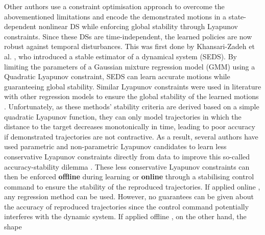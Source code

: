Other authors use a constraint optimisation approach to overcome the abovementioned limitations and encode the demonstrated motions in a state-dependent nonlinear DS while enforcing global stability through Lyapunov constraints. Since these DSs are time-independent, the learned policies are now robust against temporal disturbances. This was first done by Khansari-Zadeh et al. \cite{khansari-zadehLearningStableNonlinear2011}, who introduced a stable estimator of a dynamical system (SEDS). By limiting the parameters of a Gaussian mixture regression model (GMM) using a Quadratic Lyapunov constraint, SEDS can learn accurate motions while guaranteeing global stability. Similar Lyapunov constraints were used in literature with other regression models to ensure the global stability of the learned motions \cite{lemmeNeurallyImprintedStable2013,huNeuralLearningStable2015,umlauftLearningStableStochastic2017,umlauftLearningStableGaussian2017,medinaLearningStableTask2017,duanFastStableLearning2019,xuRobotTrajectoryTracking2019,umlauftLearningStochasticallyStable2020,ledererGaussianProcessBasedRealTime2021,xuLearningBasedKinematicControl2022,salehiLearningDiscreteTimeUncertain2022,davoodiRuleBasedSafeProbabilistic2022}. Unfortunately, as these methods' stability criteria are derived based on a simple quadratic Lyapunov function, they can only model trajectories in which the distance to the target decreases monotonically in time, leading to poor accuracy if demonstrated trajectories are not contractive. As a result, several authors have used parametric and non-parametric Lyapunov candidates to learn less conservative Lyapunov constraints directly from data to improve this so-called accuracy-stability dilemma \cite{mohammadkhansari-zadehLearningControlLyapunov2014,neumannNeuralLearningStable2013,lemmeNeuralLearningVector2014,umlauftLearningStableGaussian2017,umlauftUncertaintybasedControlLyapunov2018,duttaLearningStableMovement2018,umlauftUncertaintybasedHumanMotion2019,duttaSkillLearningHuman2021,ravanbakhshLearningControlLyapunov2019,ravanbakhshFormalPolicyLearning2019,umlauftLearningStochasticallyStable2020,xiaoLearningStableNonparametric2020,tesfazgiInverseReinforcementLearning2021,coulombeGeneratingStableCollisionFree2022,jinLearningNeuralshapedQuadratic2023}. These less conservative Lyapunov constraints can then be enforced \textbf{offline} during learning or \textbf{online} through a stabilising control command to ensure the stability of the reproduced trajectories. If applied online \cite{mohammadkhansari-zadehLearningControlLyapunov2014,umlauftLearningStableGaussian2017,umlauftUncertaintybasedControlLyapunov2018,duttaLearningStableMovement2018,umlauftUncertaintybasedHumanMotion2019,ravanbakhshFormalPolicyLearning2019,ravanbakhshLearningControlLyapunov2019,xiaoLearningStableNonparametric2020,duttaSkillLearningHuman2021,umlauftLearningStochasticallyStable2020}, any regression method can be used. However, no guarantees can be given about the accuracy of reproduced trajectories since the control command potentially interferes with the dynamic system. If applied offline \cite{neumannNeuralLearningStable2013,lemmeNeuralLearningVector2014,tesfazgiInverseReinforcementLearning2021,coulombeGeneratingStableCollisionFree2022,jinLearningNeuralshapedQuadratic2023}, on the other hand, the shape 